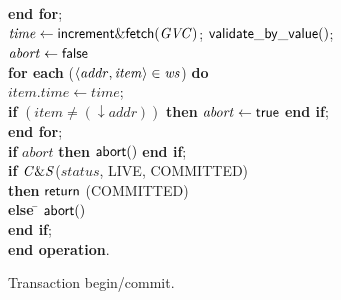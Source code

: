 \begin{figure} [htb]
{{\begin{minipage}[t]{1\linewidth}
\begin{tabbing}
 \> {\bf end for}; \\

 \> $\mathit{time} \gets {\sf increment\&fetch}(\mathit{GVC})$; ${\sf validate\_by\_value}()$; \\



 \> $\mathit{abort} \gets \lit{false}$ \\
 \> 
{\bf for each} ($\left \langle \mathit{addr, item} \right \rangle  \in \mathit{ws}$) {\bf do} \\
 \>\> $\mathit{item.time} \gets \mathit{time}$; \\
 \>\> {\bf if} $(\mathit{item} \neq (\downarrow \mathit{addr}))$  
                 {\bf then}  
		    $\mathit{abort} \gets \lit{true}$
                {\bf end if}; \\

 \> {\bf end for}; \\
 \> {\bf if} $\mathit{abort}$ {\bf then} ${\sf abort}()$ {\bf end if}; \\
 \> {\bf if} ${\sf \mathit{C\&S}}$($\mathit{status}$, LIVE, COMMITTED) \\
 \>\> {\bf then} \> ${\sf return}$ (COMMITTED)\\
 \> \> {\bf else} \= ${\sf abort}()$ \\
 \> {\bf end if};  \\
{\bf end operation}.

\end{tabbing}
\normalsize
\end{minipage}
}
\caption{Transaction begin/commit.}
\label{fig:tbc}
}
\end{figure}

